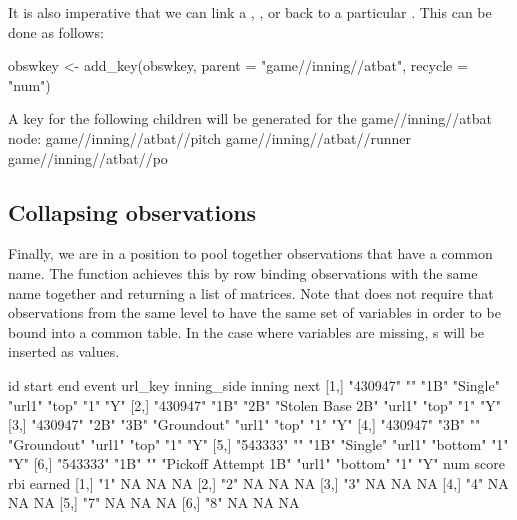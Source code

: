 \documentclass[a4paper]{report}\usepackage[]{graphicx}\usepackage[]{color}
\begin{document}
\begin{article}
It is also imperative that we can link a , ,
or  back to a particular . This can be done
as follows:

\begin{Schunk}
\begin{Sinput}
obswkey <- add_key(obswkey, parent = "game//inning//atbat", recycle = "num")
\end{Sinput}
\begin{Soutput}
A key for the following children will be generated for the game//inning//atbat node:
game//inning//atbat//pitch
game//inning//atbat//runner
game//inning//atbat//po
\end{Soutput}
\end{Schunk}



\subsection{Collapsing observations}

Finally, we are in a position to pool together observations that have
a common name. The  function achieves this by
row binding observations with the same name together and returning
a list of matrices. Note that  does not require
that observations from the same level to have the same set of variables
in order to be bound into a common table. In the case where variables
are missing, s will be inserted as values.

\begin{Schunk}
\begin{Soutput}
     id       start end  event                url_key inning_side inning next
[1,] "430947" ""    "1B" "Single"             "url1"  "top"       "1"    "Y" 
[2,] "430947" "1B"  "2B" "Stolen Base 2B"     "url1"  "top"       "1"    "Y" 
[3,] "430947" "2B"  "3B" "Groundout"          "url1"  "top"       "1"    "Y" 
[4,] "430947" "3B"  ""   "Groundout"          "url1"  "top"       "1"    "Y" 
[5,] "543333" ""    "1B" "Single"             "url1"  "bottom"    "1"    "Y" 
[6,] "543333" "1B"  ""   "Pickoff Attempt 1B" "url1"  "bottom"    "1"    "Y" 
     num score rbi earned
[1,] "1" NA    NA  NA    
[2,] "2" NA    NA  NA    
[3,] "3" NA    NA  NA    
[4,] "4" NA    NA  NA    
[5,] "7" NA    NA  NA    
[6,] "8" NA    NA  NA    
\end{Soutput}
\end{Schunk}




\end{article}
\end{document}
